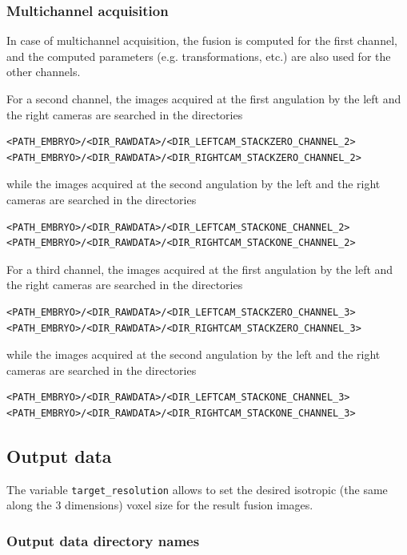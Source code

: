 \subsubsection{Multichannel acquisition}

In case of multichannel acquisition, the fusion is computed for the
first channel, and the computed parameters (e.g. transformations,
etc.) are also used for the other channels. 

For a second channel, 
the images acquired at the first angulation by the
left and the right cameras are searched in the directories
\begin{verbatim}
<PATH_EMBRYO>/<DIR_RAWDATA>/<DIR_LEFTCAM_STACKZERO_CHANNEL_2>
<PATH_EMBRYO>/<DIR_RAWDATA>/<DIR_RIGHTCAM_STACKZERO_CHANNEL_2>
\end{verbatim}
while the images acquired at the second angulation by the
left and the right cameras are searched in the directories
\begin{verbatim}
<PATH_EMBRYO>/<DIR_RAWDATA>/<DIR_LEFTCAM_STACKONE_CHANNEL_2>
<PATH_EMBRYO>/<DIR_RAWDATA>/<DIR_RIGHTCAM_STACKONE_CHANNEL_2>
\end{verbatim}

For a third channel, 
the images acquired at the first angulation by the
left and the right cameras are searched in the directories
\begin{verbatim}
<PATH_EMBRYO>/<DIR_RAWDATA>/<DIR_LEFTCAM_STACKZERO_CHANNEL_3>
<PATH_EMBRYO>/<DIR_RAWDATA>/<DIR_RIGHTCAM_STACKZERO_CHANNEL_3>
\end{verbatim}
while the images acquired at the second angulation by the
left and the right cameras are searched in the directories
\begin{verbatim}
<PATH_EMBRYO>/<DIR_RAWDATA>/<DIR_LEFTCAM_STACKONE_CHANNEL_3>
<PATH_EMBRYO>/<DIR_RAWDATA>/<DIR_RIGHTCAM_STACKONE_CHANNEL_3>
\end{verbatim}



\subsection{Output data}
\label{sec:cli:fuse:output:data}

The variable \texttt{target\_resolution} allows to set the desired isotropic (the
same along the 3 dimensions) voxel size for the result fusion
images.

\subsubsection{Output data directory names}

